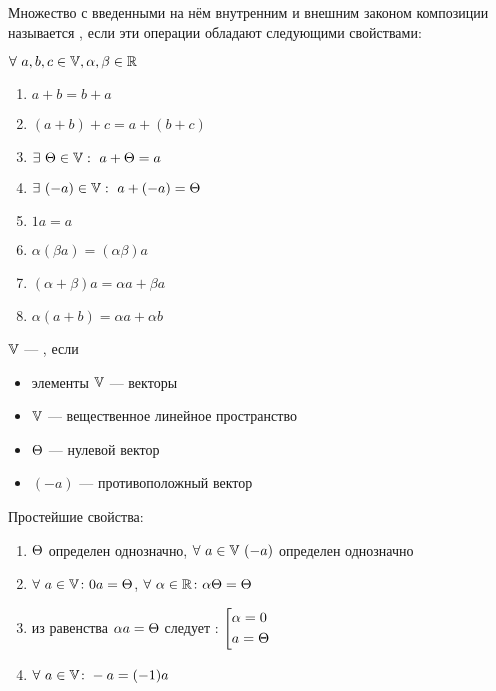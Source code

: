 \begin{opred}
Множество с введенными на нём внутренним и внешним законом композиции называется , если эти операции обладают следующими свойствами:

$\forall\ a,b,c\in\mathbb{V}, \alpha,\beta\in\mathbb{R}$
\begin{enumerate}
\item $a+b=b+a$
\item $(a+b)+c=a+(b+c)$
\item $\exists\ \T\in\V:\ a+\T=a$
\item $\exists\ (-a)\in\V:\ a+(-a)=\T$
\item $1a=a$
\item $\alpha(\beta{}a)=(\alpha\beta)a$
\item $(\alpha+\beta)a=\alpha{}a+\beta{}a$
\item $\alpha(a+b)=\alpha{}a+\alpha{}b$
\end{enumerate}
\end{opred}
\begin{opred}
$\mathbb{V}$ --- , если \begin{itemize}
\item элементы $\mathbb{V}$ --- векторы
\item $\mathbb{V}$ --- вещественное линейное пространство
\item $\Theta$ --- нулевой вектор
\item $(-a)$ --- противоположный вектор
\end{itemize}
\end{opred}
\begin{theor}
Простейшие свойства:\begin{enumerate}
\item $\Theta$ определен однозначно, $\forall\ a\in\mathbb{V}\ (-a)$ определен однозначно
\item $\forall\ a\in\mathbb{V}\colon 0a=\Theta$, $\forall\ \alpha\in\mathbb{R}\colon \alpha\Theta=\Theta$
\item из равенства $\alpha{}a=\Theta$ следует : $\left[\begin{aligned}
&\alpha=0 \\
&a=\Theta
\end{aligned}\right.$
\item $\forall\ a\in\mathbb{V}\colon -a=(-1)a$
\end{enumerate}
\end{theor}
